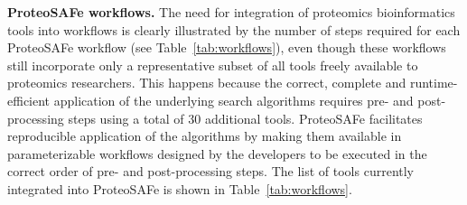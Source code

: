 \documentclass[arial,11pt]{article}
\newcommand{\SF}[1]{\textsf{#1}}
\newcommand{\SYSTEM}[0]{\SF{ProteoSAFe}\xspace}
\begin{document}





{\bf ProteoSAFe workflows.} The need for integration of proteomics bioinformatics tools into workflows is clearly illustrated by the %
number of steps required for each \SYSTEM workflow (see Table~\ref{tab:workflows}), even though these workflows still incorporate only a representative subset of all tools freely available to proteomics researchers. This happens because the correct, complete and runtime-efficient application of the underlying search algorithms requires pre- and post-processing steps using a total of 30 additional tools. \SYSTEM facilitates reproducible application of the algorithms by making them available in parameterizable workflows designed by the developers to be executed in the correct order of pre- and post-processing steps.
The list of tools currently integrated into \SYSTEM is shown in Table~\ref{tab:workflows}.
\end{document}
